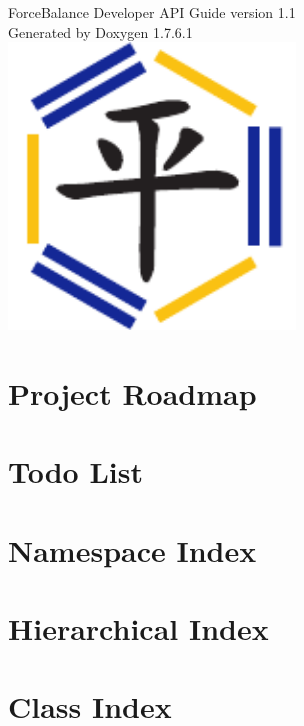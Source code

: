 \documentclass[letterpaper]{article}
\begin{document}
\hypersetup{pageanchor=false,citecolor=blue}
\begin{titlepage}
\vspace*{1cm}
\begin{center}

{\Large ForceBalance Developer API Guide version 1.1}\\
\vspace*{2cm}
{\large Generated by Doxygen 1.7.6.1}\\
\vspace*{2.5 cm}
\includegraphics[width=3in]{ForceBalance}
\end{center}
\end{titlepage}
\tableofcontents
{}
\hypersetup{pageanchor=true,citecolor=blue}
\section{Project Roadmap}
\label{roadmap}
\hypertarget{roadmap}{}

\section{Todo List}
\label{todo}
\hypertarget{todo}{}

\section{Namespace Index}

\section{Hierarchical Index}

\section{Class Index}

\end{document}
